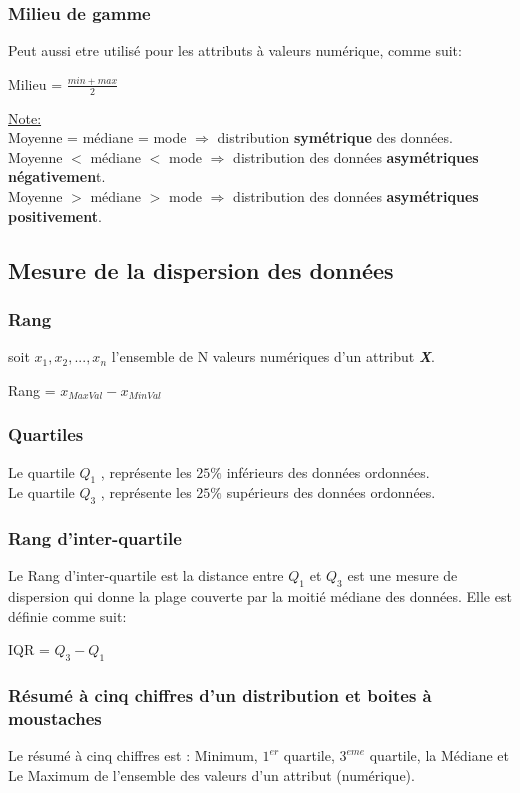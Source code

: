 \documentclass[12pt,a4paper,oneside]{book}
\begin{document}
\subsubsection{Milieu de gamme}
Peut aussi etre utilisé pour les attributs à valeurs numérique, comme suit:
\begin{center}
 	Milieu = $\frac{min + max}{2}$
\end{center}

\underline{Note:}\\
Moyenne = médiane = mode $\Rightarrow$ distribution \textbf{symétrique} des données.\\
Moyenne $<$ médiane $<$ mode $\Rightarrow$ distribution des données \textbf{asymétriques négativemen}t.\\
Moyenne $>$ médiane $>$ mode $\Rightarrow$ distribution des données \textbf{asymétriques positivement}.\\

\subsection{Mesure de la dispersion des données}
\subsubsection{Rang}
soit $x_{1}, x_{2}, ... ,x_{n}$ l'ensemble de N valeurs numériques d'un attribut \textit{\textbf{X}}.
\begin{center}
	Rang = $x_{MaxVal} - x_{MinVal}$
\end{center}
\subsubsection{Quartiles}
Le quartile $Q_{1}$ , représente les $25\%$ inférieurs des données ordonnées.\\
Le quartile $Q_{3}$ , représente les $25\%$ supérieurs des données ordonnées.

\subsubsection{Rang d'inter-quartile}
Le Rang d'inter-quartile est la distance entre $Q_{1}$ et $Q_{3}$ est une mesure de dispersion qui donne la plage couverte par la moitié médiane des données.
Elle est définie comme suit:
\begin{center}
	IQR = $Q_{3} - Q_{1}$
\end{center}

\subsubsection{Résumé à cinq chiffres d'un distribution et boites à moustaches}
Le résumé à cinq chiffres est : Minimum, $1^{er}$ quartile, $3^{eme}$ quartile, la Médiane et Le Maximum de l'ensemble des valeurs d'un attribut (numérique).
\end{document}
